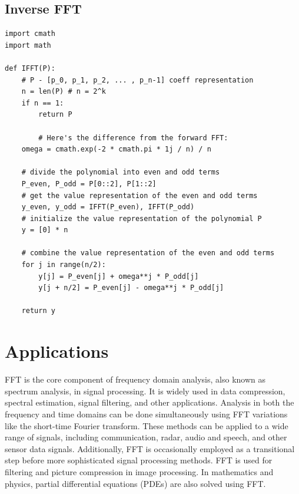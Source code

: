\documentclass[28]{report}
\begin{document}
\section{Inverse FFT} 

\begin{verbatim}
import cmath
import math

def IFFT(P):
	# P - [p_0, p_1, p_2, ... , p_n-1] coeff representation
	n = len(P) # n = 2^k
	if n == 1:
		return P

        # Here's the difference from the forward FFT:
	omega = cmath.exp(-2 * cmath.pi * 1j / n) / n

	# divide the polynomial into even and odd terms
	P_even, P_odd = P[0::2], P[1::2]
	# get the value representation of the even and odd terms
	y_even, y_odd = IFFT(P_even), IFFT(P_odd)
	# initialize the value representation of the polynomial P
	y = [0] * n

	# combine the value representation of the even and odd terms
	for j in range(n/2):
		y[j] = P_even[j] + omega**j * P_odd[j]
		y[j + n/2] = P_even[j] - omega**j * P_odd[j]

	return y
\end{verbatim}

\chapter{Applications}
FFT is the core component of frequency domain analysis, also known as spectrum analysis, in signal processing. It is widely used in data compression, spectral estimation, signal filtering, and other applications. Analysis in both the frequency and time domains can be done simultaneously using FFT variations like the short-time Fourier transform. These methods can be applied to a wide range of signals, including communication, radar, audio and speech, and other sensor data signals. Additionally, FFT is occasionally employed as a transitional step before more sophisticated signal processing methods. FFT is used for filtering and picture compression in image processing. In mathematics and physics, partial differential equations (PDEs) are also solved using FFT.
\end{document}
